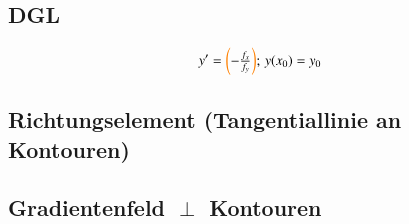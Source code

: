 

\subsection{DGL}
\[
    y' = \tikznode{rhsfn}{\bbr{orange}{-\frac{f_{x}}{f_{y}}}};\, y(x_{0}) = y_{0}
\]

\subsection{Richtungselement (Tangentiallinie an Kontouren)}


\subsection{Gradientenfeld \texorpdfstring{$\perp$}{\_|\_} Kontouren}
